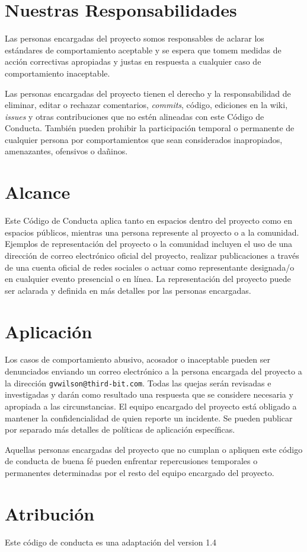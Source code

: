 \section*{Nuestras Responsabilidades}

Las personas encargadas del proyecto somos responsables de aclarar los estándares de
comportamiento aceptable y se espera que tomem medidas de acción correctivas
apropiadas y justas en respuesta a cualquier caso de comportamiento inaceptable.

Las personas encargadas del proyecto tienen el derecho y la responsabilidad de
eliminar, editar o rechazar comentarios, \emph{commits}, código, ediciones en la wiki, \emph{issues} y otras
contribuciones que no estén alineadas con este Código de Conducta. También pueden
prohibir la participación temporal o permanente de cualquier persona por comportamientos
que sean considerados inapropiados, amenazantes, ofensivos o dañinos.

\section*{Alcance}

Este Código de Conducta aplica tanto en espacios dentro del proyecto
como en espacios públicos, mientras una persona represente al proyecto o a
la comunidad. Ejemplos de representación del proyecto o la comunidad incluyen
el uso de una dirección de correo electrónico oficial del proyecto,
realizar publicaciones a través de una cuenta oficial de redes sociales
o actuar como representante designada/o en cualquier evento presencial o en línea.
La representación del proyecto puede ser aclarada y definida en más
detalles por las personas encargadas.

\section*{Aplicación}

Los casos de comportamiento abusivo, acosador o inaceptable
pueden ser denunciados enviando un correo electrónico a la persona encargada del proyecto a la dirección \texttt{gvwilson@third-bit.com}.
Todas las quejas serán revisadas e investigadas y darán como resultado
una respuesta que se considere necesaria y apropiada a las circunstancias.
El equipo encargado del proyecto está obligado a mantener la confidencialidad de quien reporte un incidente.
Se pueden publicar por separado más detalles
de políticas de aplicación específicas.

Aquellas personas encargadas del proyecto que no cumplan o apliquen 
este código de conducta de buena fé pueden enfrentar repercusiones
temporales o permanentes determinadas por el resto del equipo encargado
del proyecto.

\section*{Atribución}

Este código de conducta es una adaptación del
 version 1.4
